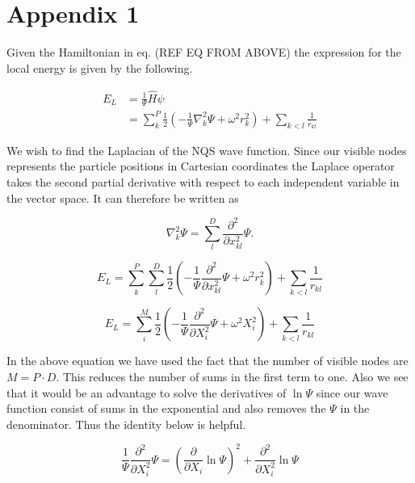 \section{Appendix 1}

Given the Hamiltonian in eq. (REF EQ FROM ABOVE) the expression for the local energy is given by the following.

\begin{align*}
E_L &= \frac{1}{\Psi}\hat{H}\psi \\
&= \sum_{k}^{P} \frac{1}{2} \left( -\frac{1}{\Psi} \nabla_k^2 \Psi +  \omega^2 r_k^2 \right) + \sum_{k < l} \frac{1}{r_{kl}}
\end{align*}

We wish to find the Laplacian of the NQS wave function. Since our visible nodes represents the particle positions in Cartesian coordinates the Laplace operator takes the second partial derivative with respect to each independent variable in the vector space. It can therefore be written as  

\begin{equation*}
\nabla_k^2 \Psi = \sum_{l}^{D} \frac{\partial^2}{\partial x_{kl}^2} \Psi.
\end{equation*}

\begin{equation*}
E_L = \sum_{k}^{P} \sum_{l}^{D} \frac{1}{2} \left( -\frac{1}{\Psi} \frac{\partial^2}{\partial x_{kl}^2} \Psi +  \omega^2 r_k^2 \right) + \sum_{k < l} \frac{1}{r_{kl}}
\end{equation*}

\begin{equation*}
E_L = \sum_{i}^{M} \frac{1}{2} \left( -\frac{1}{\Psi} \frac{\partial^2}{\partial X_{i}^2} \Psi +  \omega^2 X_i^2 \right) +  \sum_{k < l} \frac{1}{r_{kl}}
\end{equation*}

In the above equation we have used the fact that the number of visible nodes are $M = P \cdot D$. This reduces the number of sums in the first term to one. Also we see that it would be an advantage to solve the derivatives of $\ln \Psi$ since our wave function consist of sums in the exponential and also removes the $\Psi$ in the denominator. Thus the identity below is helpful. 

\begin{equation*}
\frac{1}{\Psi} \frac{\partial^2}{\partial X_{i}^2} \Psi = \left( \frac{\partial}{\partial X_{i}} \ln \Psi \right)^2 + \frac{\partial^2}{\partial X_{i}^2} \ln \Psi
\end{equation*}


